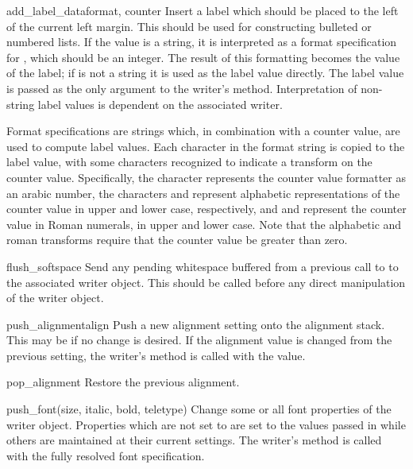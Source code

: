 \begin{funcdesc}{add_label_data}{format, counter}
Insert a label which should be placed to the left of the current left
margin.  This should be used for constructing bulleted or numbered
lists.  If the  value is a string, it is interpreted as a
format specification for , which should be an integer.
The result of this formatting becomes the value of the label; if
 is not a string it is used as the label value directly.
The label value is passed as the only argument to the writer's
 method.  Interpretation of non-string label
values is dependent on the associated writer.

Format specifications are strings which, in combination with a counter
value, are used to compute label values.  Each character in the format
string is copied to the label value, with some characters recognized
to indicate a transform on the counter value.  Specifically, the
character  represents the counter value formatter as an
arabic number, the characters  and  represent
alphabetic representations of the counter value in upper and lower
case, respectively, and  and  represent the
counter value in Roman numerals, in upper and lower case.  Note that
the alphabetic and roman transforms require that the counter value be
greater than zero.
\end{funcdesc}

\begin{funcdesc}{flush_softspace}{}
Send any pending whitespace buffered from a previous call to
 to the associated writer object.  This
should be called before any direct manipulation of the writer object.
\end{funcdesc}

\begin{funcdesc}{push_alignment}{align}
Push a new alignment setting onto the alignment stack.  This may be
 if no change is desired.  If the alignment value is
changed from the previous setting, the writer's 
method is called with the  value.
\end{funcdesc}

\begin{funcdesc}{pop_alignment}{}
Restore the previous alignment.
\end{funcdesc}

\begin{funcdesc}{push_font}{(size, italic, bold, teletype)}
Change some or all font properties of the writer object.  Properties
which are not set to  are set to the values passed in
while others are maintained at their current settings.  The writer's
 method is called with the fully resolved font
specification.
\end{funcdesc}

